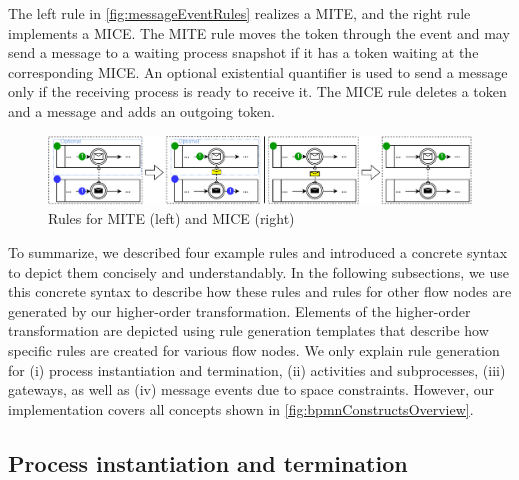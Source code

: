 \documentclass[runningheads]{llncs}
\begin{document}
The left rule in \autoref{fig:messageEventRules} realizes a MITE, and the right rule implements a MICE.
The MITE rule moves the token through the event and may send a message to a waiting process snapshot if it has a token waiting at the corresponding MICE.
An optional existential quantifier \cite{rensinkNestedQuantificationGraph2006} is used to send a message only if the receiving process is ready to receive it.
The MICE rule deletes a token and a message and adds an outgoing token.

\begin{figure}[ht]
    \centering
    \includegraphics[width=1\textwidth]{images/bpmn_semantics-message-events.pdf}
    \caption{Rules for MITE (left) and MICE (right)}
    \label{fig:messageEventRules}
\end{figure}

To summarize, we described four example rules and introduced a concrete syntax to depict them concisely and understandably.
In the following subsections, we use this concrete syntax to describe how these rules and rules for other flow nodes are generated by our higher-order transformation.
Elements of the higher-order transformation are depicted using rule generation templates that describe how specific rules are created for various flow nodes.
We only explain rule generation for (i) process instantiation and termination, (ii) activities and subprocesses, (iii) gateways, as well as (iv) message events due to space constraints.
However, our implementation covers all concepts shown in \autoref{fig:bpmnConstructsOverview}.


\subsection{Process instantiation and termination} \label{subsec:instAndTermination}
\end{document}
